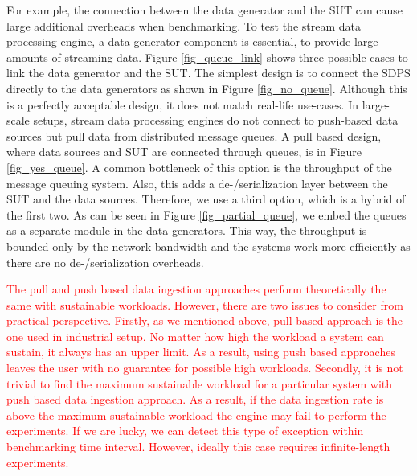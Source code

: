 For example, the connection between the data generator and the SUT can cause large additional overheads when benchmarking.  To test the stream data processing engine, a data generator component is essential, to provide large amounts of streaming data. Figure \ref{fig_queue_link} shows  three possible cases to link the data generator and the SUT. The simplest design is to connect the SDPS directly to the data generators as shown in Figure \ref{fig_no_queue}. Although this is a perfectly acceptable design, it does not match real-life use-cases. In large-scale setups, stream data processing engines do not connect to push-based data sources but pull data from distributed message queues. A pull based design, where data sources and SUT are connected through queues, is in Figure \ref{fig_yes_queue}. A common bottleneck of this option is the throughput of the message queuing system. Also, this adds  a de-/serialization layer between the SUT and the data sources. Therefore, we use a third option, which is a hybrid of the first two. As can be seen in Figure \ref{fig_partial_queue}, we embed the queues as a separate module in the data generators. This way, the throughput is bounded only by the network bandwidth and the systems work more efficiently as there are no de-/serialization overheads.%

\textcolor{red}{The pull and push based data ingestion approaches  perform theoretically the same with sustainable workloads. However, there are two issues to consider from practical perspective. Firstly, as we mentioned above, pull based approach is the one used in industrial setup. No matter how high the workload a system can sustain, it always has an upper limit. As a result, using push based approaches leaves the user with no guarantee for possible high workloads. Secondly, it is not trivial to find the maximum sustainable workload for a particular system with push based data ingestion approach. As a result, if the data ingestion rate is above the maximum sustainable workload the engine may fail to perform the experiments. If we are lucky, we can detect this type of exception within benchmarking time interval. However, ideally this case  requires infinite-length experiments. }



